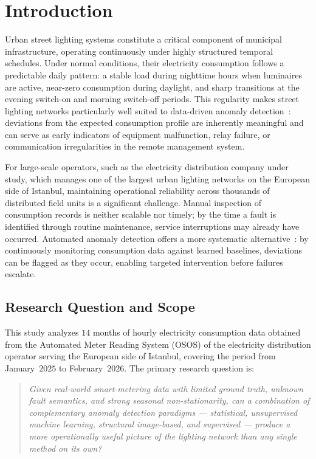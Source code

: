 \documentclass[11pt]{article}
\begin{document}
\section{Introduction}
Urban street lighting systems constitute a critical component of municipal infrastructure, operating continuously under highly structured temporal schedules. Under normal conditions, their electricity consumption follows a predictable daily pattern: a stable load during nighttime hours when luminaires are active, near-zero consumption during daylight, and sharp transitions at the evening switch-on and morning switch-off periods. This regularity makes street lighting networks particularly well suited to data-driven anomaly detection~\cite{nespoli2024street,ptacek2022road}: deviations from the expected consumption profile are inherently meaningful and can serve as early indicators of equipment malfunction, relay failure, or communication irregularities in the remote management system.

For large-scale operators, such as the electricity distribution company under study, which manages one of the largest urban lighting networks on the European side of Istanbul, maintaining operational reliability across thousands of distributed field units is a significant challenge. Manual inspection of consumption records is neither scalable nor timely; by the time a fault is identified through routine maintenance, service interruptions may already have occurred. Automated anomaly detection offers a more systematic alternative~\cite{himeur2021survey,wang2020review}: by continuously monitoring consumption data against learned baselines, deviations can be flagged as they occur, enabling targeted intervention before failures escalate.

\subsection*{Research Question and Scope}
This study analyzes $14$ months of hourly electricity consumption data obtained from the Automated Meter Reading System (OSOS) of the electricity distribution operator serving the European side of Istanbul, covering the period from January~$2025$ to February~$2026$. The primary research question is:

\begin{quote}
\emph{Given real-world smart-metering data with limited ground truth, unknown fault semantics, and strong seasonal non-stationarity, can a combination of complementary anomaly detection paradigms --- statistical, unsupervised machine learning, structural image-based, and supervised --- produce a more operationally useful picture of the lighting network than any single method on its own?}
\end{quote}
\end{document}
